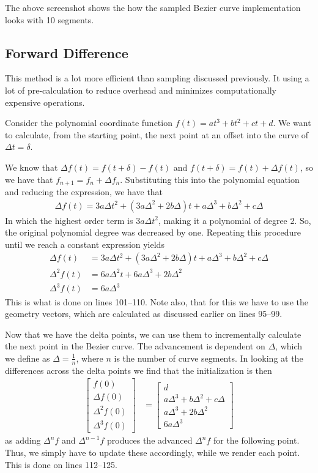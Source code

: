 \documentclass[11pt]{article}
\begin{document}
The above screenshot shows the how the sampled Bezier curve implementation
looks with 10 segments.

\subsection{Forward Difference}
This method is a lot more efficient than sampling discussed previously. It
using a lot of pre-calculation to reduce overhead and minimizes
computationally expensive operations.

Consider the polynomial coordinate function $f(t) = at^3 + bt^2 + ct + d$. We
want to calculate, from the starting point, the next point at an offset into
the curve of $\Delta t = \delta$.

We know that $\Delta f(t) = f(t + \delta) - f(t)$ and $f(t + \delta) = f(t) +
\Delta f(t)$, so we have that $f_{n+1} = f_n + \Delta f_n$. Substituting this
into the polynomial equation and reducing the expression, we have that
\begin{align}
    \Delta f(t) = 3a\Delta t^2 + (3a\Delta^2 + 2b\Delta)t + a\Delta^3 + b\Delta^2 + c\Delta
\end{align}
In which the highest order term is $3a\Delta t^2$, making it a polynomial of
degree 2. So, the original polynomial degree was decreased by one. Repeating
this procedure until we reach a constant expression yields
\begin{align}
    \Delta f(t)   &= 3a\Delta t^2 + (3a\Delta^2 + 2b\Delta)t + a\Delta^3 + b\Delta^2 + c\Delta \\
    \Delta^2 f(t) &= 6 a \Delta^2 t + 6 a \Delta^3 + 2 b \Delta^2 \\
    \Delta^3 f(t) &= 6 a \Delta^3
\end{align}
This is what is done on lines 101--110. Note also, that for this we have to
use the geometry vectors, which are calculated as discussed earlier on lines
95--99.

Now that we have the delta points, we can use them to incrementally calculate
the next point in the Bezier curve. The advancement is dependent on $\Delta$,
which we define as $\Delta = \frac{1}{n}$, where $n$ is the number of curve
segments. In looking at the differences across the delta points we find that
the initialization is then
\begin{align}
    \begin{bmatrix}
        f(0) \\
        \Delta f(0) \\
        \Delta^2 f(0) \\
        \Delta^3 f(0)
    \end{bmatrix}
    &=
    \begin{bmatrix}
        d \\
        a \Delta^3 + b \Delta^2 + c \Delta \\
        a \Delta^3 + 2 b \Delta^2 \\
        6 a \Delta^3
    \end{bmatrix}
\end{align}
as adding $\Delta^n f$ and $\Delta^{n-1} f$ produces the advanced $\Delta^n f$
for the following point. Thus, we simply have to update these accordingly,
while we render each point. This is done on lines 112--125.
\end{document}
